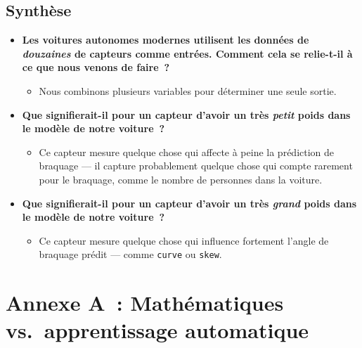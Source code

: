 \documentclass[12pt,a4paper]{article}
\begin{document}
\subsection{Synthèse}

\begin{thinkbox}
  \begin{itemize}
    \item \textbf{Les voitures autonomes modernes utilisent les données de \emph{douzaines} de capteurs comme entrées. Comment cela se relie-t-il à ce que nous venons de faire~?}
    \begin{itemize}
      \item Nous combinons plusieurs variables pour déterminer une seule sortie.
    \end{itemize}
    \item \textbf{Que signifierait-il pour un capteur d'avoir un très \emph{petit} poids dans le modèle de notre voiture~?}
    \begin{itemize}
      \item Ce capteur mesure quelque chose qui affecte à peine la prédiction de braquage — il capture probablement quelque chose qui compte rarement pour le braquage, comme le nombre de personnes dans la voiture.
    \end{itemize}
    \item \textbf{Que signifierait-il pour un capteur d'avoir un très \emph{grand} poids dans le modèle de notre voiture~?}
    \begin{itemize}
      \item Ce capteur mesure quelque chose qui influence fortement l'angle de braquage prédit — comme \texttt{curve} ou \texttt{skew}.
    \end{itemize}
  \end{itemize}
\end{thinkbox}

\newpage

\section*{Annexe A~: Mathématiques vs.\ apprentissage automatique}
\end{document}
